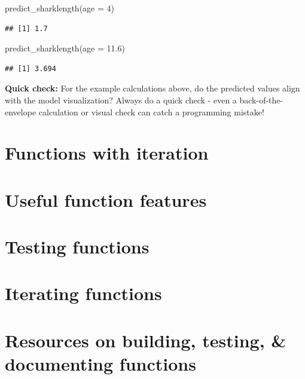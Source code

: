 \documentclass[
]{book}
\newenvironment{Shaded}{\begin{snugshade}}{\end{snugshade}}
\newcommand{\AttributeTok}[1]{\textcolor[rgb]{0.77,0.63,0.00}{#1}}
\newcommand{\DecValTok}[1]{\textcolor[rgb]{0.00,0.00,0.81}{#1}}
\newcommand{\FloatTok}[1]{\textcolor[rgb]{0.00,0.00,0.81}{#1}}
\newcommand{\FunctionTok}[1]{\textcolor[rgb]{0.00,0.00,0.00}{#1}}
\newcommand{\NormalTok}[1]{#1}
\begin{document}
\begin{Shaded}
\begin{Highlighting}[]
\FunctionTok{predict\_sharklength}\NormalTok{(}\AttributeTok{age =} \DecValTok{4}\NormalTok{)}
\end{Highlighting}
\end{Shaded}

\begin{verbatim}
## [1] 1.7
\end{verbatim}

\begin{Shaded}
\begin{Highlighting}[]
\FunctionTok{predict\_sharklength}\NormalTok{(}\AttributeTok{age =} \FloatTok{11.6}\NormalTok{)}
\end{Highlighting}
\end{Shaded}

\begin{verbatim}
## [1] 3.694
\end{verbatim}

\textbf{Quick check:} For the example calculations above, do the predicted values align with the model visualization? Always do a quick check - even a back-of-the-envelope calculation or visual check can catch a programming mistake!

\hypertarget{functions-with-iteration}{%
\section{Functions with iteration}\label{functions-with-iteration}}

\hypertarget{useful-function-features}{%
\section{Useful function features}\label{useful-function-features}}

\hypertarget{testing-functions}{%
\section{Testing functions}\label{testing-functions}}

\hypertarget{iterating-functions}{%
\section{Iterating functions}\label{iterating-functions}}

\hypertarget{resources-on-building-testing-documenting-functions}{%
\section{Resources on building, testing, \& documenting functions}\label{resources-on-building-testing-documenting-functions}}
\end{document}
